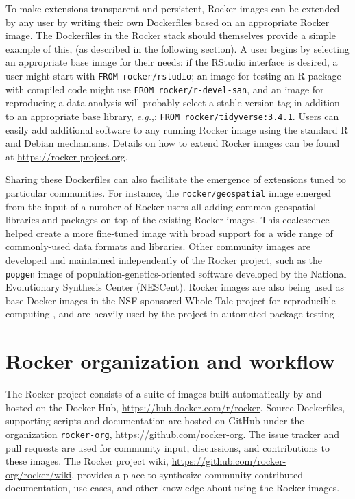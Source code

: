To make extensions transparent and persistent, Rocker images can be
extended by any user by writing their own Dockerfiles based on an
appropriate Rocker image. The Dockerfiles in the Rocker stack should
themselves provide a simple example of this, (as described in the
following section). A user begins by selecting an appropriate base image
for their needs: if the RStudio\textsuperscript{\textregistered}
interface is desired, a user might start with
\texttt{FROM\ rocker/rstudio}; an image for testing an R package with
compiled code might use \texttt{FROM\ rocker/r-devel-san}, and an image
for reproducing a data analysis will probably select a stable version
tag in addition to an appropriate base library, \emph{e.g.},:
\texttt{FROM\ rocker/tidyverse:3.4.1}. Users can easily add additional
software to any running Rocker image using the standard R and Debian
mechanisms. Details on how to extend Rocker images can be found at
\url{https://rocker-project.org}.

Sharing these Dockerfiles can also facilitate the emergence of
extensions tuned to particular communities. For instance, the
\texttt{rocker/geospatial} image emerged from the input of a number of
Rocker users all adding common geospatial libraries and packages on top
of the existing Rocker images. This coalescence helped create a more
fine-tuned image with broad support for a wide range of commonly-used
data formats and libraries. Other community images are developed and
maintained independently of the Rocker project, such as the
\texttt{popgen} image of population-genetics-oriented software developed
by the National Evolutionary Synthesis Center (NESCent). Rocker images
are also being used as base Docker images in the NSF sponsored Whole
Tale project for reproducible computing \citep{wholetale}, and are
heavily used by the  project in automated package testing
\citep{rhub}.

\section{Rocker organization and
workflow}\label{rocker-organization-and-workflow}

The Rocker project consists of a suite of images built automatically by
and hosted on the Docker Hub, \url{https://hub.docker.com/r/rocker}.
Source Dockerfiles, supporting scripts and documentation are hosted on
GitHub under the organization \texttt{rocker-org},
\url{https://github.com/rocker-org}. The issue tracker and pull requests
are used for community input, discussions, and contributions to these
images. The Rocker project wiki,
\url{https://github.com/rocker-org/rocker/wiki}, provides a place to
synthesize community-contributed documentation, use-cases, and other
knowledge about using the Rocker images.

